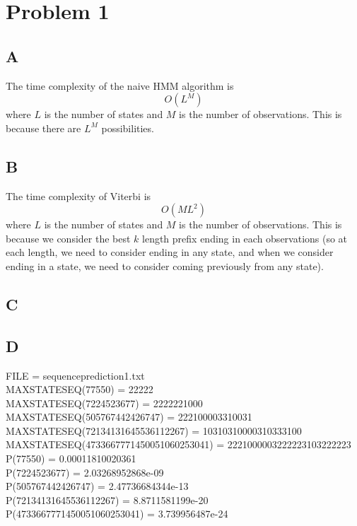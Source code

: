 \documentclass{article}
\begin{document}
\section*{Problem 1}
\subsection*{A}
The time complexity of the naive HMM algorithm is
\[ O(L^M) \]
where $L$ is the number of states and $M$ is the number of observations.
This is because there are $L^M$ possibilities.

\subsection*{B}
The time complexity of Viterbi is
\[ O(ML^2) \]
where $L$ is the number of states and $M$ is the number of observations.
This is because we consider the best $k$ length prefix ending in each observations (so at
each length, we need to consider ending in any state, and when we consider
ending in a state, we need to consider coming previously from any state).

\subsection*{C}

\subsection*{D}
FILE =  sequenceprediction1.txt \\
MAXSTATESEQ(77550) = 22222 \\
MAXSTATESEQ(7224523677) = 2222221000 \\
MAXSTATESEQ(505767442426747) = 222100003310031 \\
MAXSTATESEQ(72134131645536112267) = 10310310000310333100 \\
MAXSTATESEQ(4733667771450051060253041) = 2221000003222223103222223 \\
P(77550) = 0.00011810020361  \\
P(7224523677) = 2.03268952868e-09  \\
P(505767442426747) = 2.47736684344e-13  \\
P(72134131645536112267) = 8.8711581199e-20  \\
P(4733667771450051060253041) = 3.739956487e-24  \\
\end{document}
